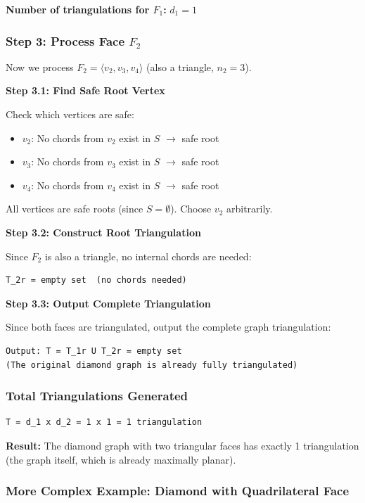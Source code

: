 \documentclass[12pt,a4paper]{article}
\theoremstyle{definition}
\theoremstyle{remark}
\begin{document}
\textbf{Number of triangulations for $F_1$:} $d_1 = 1$

\subsubsection{Step 3: Process Face $F_2$}

Now we process $F_2 = \langle v_2, v_3, v_4 \rangle$ (also a triangle, $n_2 = 3$).

\textbf{Step 3.1: Find Safe Root Vertex}

Check which vertices are safe:
\begin{itemize}
    \item $v_2$: No chords from $v_2$ exist in $S$ $\to$ safe root
    \item $v_3$: No chords from $v_3$ exist in $S$ $\to$ safe root
    \item $v_4$: No chords from $v_4$ exist in $S$ $\to$ safe root
\end{itemize}

All vertices are safe roots (since $S = \emptyset$). Choose $v_2$ arbitrarily.

\textbf{Step 3.2: Construct Root Triangulation}

Since $F_2$ is also a triangle, no internal chords are needed:
\begin{verbatim}
T_2r = empty set  (no chords needed)
\end{verbatim}

\textbf{Step 3.3: Output Complete Triangulation}

Since both faces are triangulated, output the complete graph triangulation:
\begin{verbatim}
Output: T = T_1r U T_2r = empty set
(The original diamond graph is already fully triangulated)
\end{verbatim}

\subsubsection{Total Triangulations Generated}

\begin{verbatim}
T = d_1 x d_2 = 1 x 1 = 1 triangulation
\end{verbatim}

\textbf{Result:} The diamond graph with two triangular faces has exactly 1 triangulation (the graph itself, which is already maximally planar).

\subsubsection{More Complex Example: Diamond with Quadrilateral Face}
\end{document}
